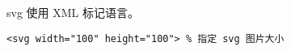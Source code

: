 
\begin{issues}
\issueDraft
\end{issues}

svg 使用 XML 标记语言。

\begin{lstlisting}[language=none]
<svg width="100" height="100"> % 指定 svg 图片大小
\end{lstlisting}

